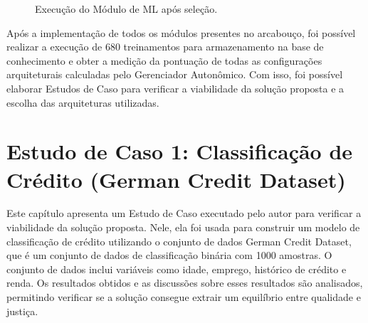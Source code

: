 \documentclass[Portugues,Final]{ic-tese-v3}
\begin{document}
\begin{figure}[H]
    \centering
    \caption{Execução do Módulo de ML após seleção.}
    \label{fig:pipelineAutonomoResultado}
\end{figure}

Após a implementação de todos os módulos presentes no arcabouço, foi possível realizar a execução de 680 treinamentos para armazenamento na base de conhecimento e obter a medição da pontuação de todas as configurações arquiteturais calculadas pelo Gerenciador Autonômico. Com isso, foi possível elaborar Estudos de Caso para verificar a viabilidade da solução proposta e a escolha das arquiteturas utilizadas.

\chapter{Estudo de Caso 1: Classificação de Crédito (German Credit Dataset)}

Este capítulo apresenta um Estudo de Caso executado pelo autor para verificar a viabilidade da solução proposta. Nele, ela foi usada para construir um modelo de classificação de crédito utilizando o conjunto de dados German Credit Dataset, que é um conjunto de dados de classificação binária com 1000 amostras. O conjunto de dados inclui variáveis como idade, emprego, histórico de crédito e renda. Os resultados obtidos e as discussões sobre esses resultados são analisados, permitindo verificar se a solução consegue extrair um equilíbrio entre qualidade e justiça.
\end{document}
